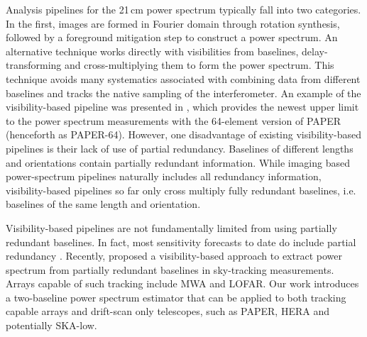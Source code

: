 \documentclass[twocolumn,apj,numberedappendix]{emulateapj}
\renewcommand\[{\begin{equation}}
\renewcommand\]{\end{equation}}
\begin{document}
Analysis pipelines for the 21\,cm power spectrum typically fall into two categories. In the first, images are formed in Fourier domain through rotation synthesis, followed by a foreground mitigation step to construct a power spectrum. An alternative technique works directly with visibilities from baselines, delay-transforming and cross-multiplying them to form the power spectrum. This technique avoids many systematics associated with combining data from different baselines and tracks the native sampling of the interferometer. An example of the visibility-based pipeline was presented in \cite{Ali2015}, which provides the newest upper limit to the power spectrum
measurements with the 64-element version of PAPER (henceforth as PAPER-64). However, one disadvantage of existing visibility-based pipelines is their lack of use of partial redundancy. Baselines of different lengths and orientations contain partially redundant information. While imaging based power-spectrum pipelines naturally includes all redundancy information, visibility-based pipelines so far only cross multiply fully redundant baselines, i.e. baselines of the same length and orientation.

Visibility-based pipelines are not fundamentally limited from using partially redundant baselines. In fact, most sensitivity forecasts to date do include partial redundancy \citep{Pobersens, HERA, JoshAntPos}. Recently, \cite{wterm} proposed a visibility-based approach to extract power spectrum from partially redundant baselines in sky-tracking measurements. Arrays capable of such tracking include MWA and LOFAR. Our work introduces a two-baseline power spectrum estimator that can be applied to both tracking capable arrays and drift-scan only telescopes, such as PAPER, HERA and potentially SKA-low.
\end{document}
